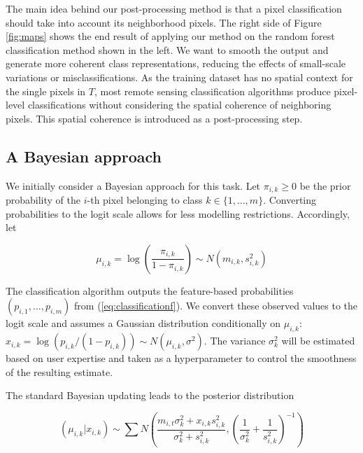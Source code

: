 \documentclass[
  shortnames]{jss}
\begin{document}
The main idea behind our post-processing method is that a pixel classification should take into account its neighborhood pixels. The right side of Figure \ref{fig:maps} shows the end result of applying our method on the random forest classification method shown in the left. We want to smooth the output and generate more coherent class representations, reducing the effects of small-scale variations or misclassifications. As the training dataset has no spatial context for the single pixels in \(T\), most remote sensing classification algorithms produce pixel-level classifications without considering the spatial coherence of neighboring pixels. This spatial coherence is introduced as a post-processing step.

\hypertarget{a-bayesian-approach}{%
\subsection{A Bayesian approach}\label{a-bayesian-approach}}

We initially consider a Bayesian approach for this task. Let \(\pi_{i,k} \geq 0\) be the prior probability of the \(i\)-th pixel belonging to class \(k \in \{1, \ldots, m\}\).
Converting probabilities to the logit scale allows for less modelling restrictions. Accordingly, let

\begin{equation*} 
\mu_{i,k} = \log\left( \frac{\pi_{i,k}}{1-\pi_{i,k}} \right) \sim N(m_{i,k}, s^2_{i,k}) 
\end{equation*}

The classification algorithm outputs the feature-based probabilities \((p_{i,1}, \ldots, p_{i,m})\) from (\ref{eq:classificationf}). We convert these observed values to the logit
scale and assumes a Gaussian distribution conditionally on \(\mu_{i,k}\):
\(x_{i,k} = \log(p_{i,k}/(1-p_{i,k})) \sim N(\mu_{i,k}, \sigma^2)\).
The variance \(\sigma^2_{k}\) will be estimated based on user expertise and taken as a hyperparameter to control the smoothness of the resulting estimate.

The standard Bayesian updating \citep{Gelman2014} leads to the posterior distribution

\begin{equation}
(\mu_{i,k} | x_{i,k}) \sim \sum N\left(  \frac{m_{i,t} \sigma^2_{k} +
    x_{i,k} s^2_{i,k}}{ \sigma^2_{k} +s^2_{i,k}} , \left( \frac{1}{\sigma_k^2} + \frac{1}{s^2_{i,k}} \right)^{-1} \right) 
\label{eq:BayesUpdate}
\end{equation}
\end{document}
